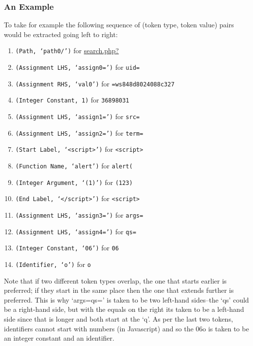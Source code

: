 \subsubsection{An Example}
To take for example  the following sequence of (token type, token value) pairs would be extracted going left to right:

\begin{enumerate}
\item \texttt{(Path, `path0/')} for \url{search.php?}
\item \texttt{(Assignment LHS, `assign0=')} for \texttt{uid=}
\item \texttt{(Assignment RHS, `val0')} for \texttt{=ws848d8024088c327}
\item \texttt{(Integer Constant, 1)} for \texttt{36898031}
\item \texttt{(Assignment LHS, `assign1=')} for \texttt{src=}
\item \texttt{(Assignment LHS, `assign2=')} for \texttt{term=}
\item \texttt{(Start Label, `<script>')} for \texttt{<script>}
\item \texttt{(Function Name, `alert')} for \texttt{alert(}
\item \texttt{(Integer Argument, `(1)')} for \texttt{(123)}
\item \texttt{(End Label, `</script>')} for \texttt{<script>}
\item \texttt{(Assignment LHS, `assign3=')} for \texttt{args=}
\item \texttt{(Assignment LHS, `assign4=')} for \texttt{qs=}
\item \texttt{(Integer Constant, `06')} for \texttt{06}
\item \texttt{(Identifier, `o')} for \texttt{o}
\end{enumerate}

Note that if two different token types overlap, the one that starts earlier is preferred; if they start in the same place then the one that extends further is preferred. This is why `args=qs=' is taken to be two left-hand sides--the `qs' could be a right-hand side, but with the equals on the right its taken to be a left-hand side since that is longer and both start at the `q'. As per the last two tokens, identifiers cannot start with numbers  (in Javascript) and so the 06o is taken to be an integer constant and an identifier.


